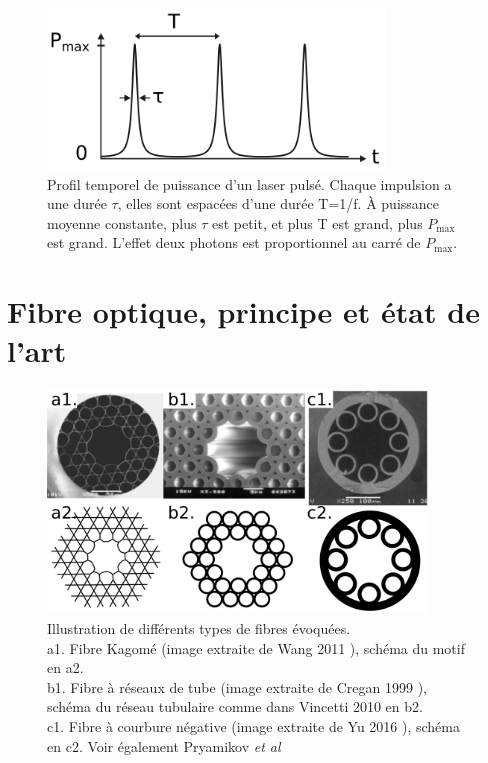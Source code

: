 
\begin{figure}
\centering
\includegraphics[width=0.8\textwidth]{./files/pulsed_laser.svg.png}
\caption{Profil temporel de puissance d'un laser pulsé. Chaque impulsion a une durée $\tau$, elles sont espacées d'une durée T=1/f. À puissance moyenne constante, plus $\tau$ est petit, et plus T est grand, plus $P_\text{max}$ est grand. L'effet deux photons est proportionnel au carré de $P_\text{max}$.
}
\label{pulsed-laser}
\end{figure}



\section{Fibre optique, principe et état de l'art}

\begin{figure}
\centering
\includegraphics[width=0.9\textwidth]{./files/fibers.svg.png}
\caption{Illustration de différents types de fibres évoquées.\\
a1. Fibre Kagomé (image extraite de Wang 2011 \cite{wang_low_2011}), schéma du motif en a2.\\
b1. Fibre à réseaux de tube (image extraite de Cregan 1999 \cite{cregan_single-mode_1999}), schéma du réseau tubulaire comme dans Vincetti 2010 \cite{vincetti_waveguiding_2010} en b2.\\
c1. Fibre à courbure négative (image extraite de Yu 2016 \cite{yu_negative_2016}), schéma en c2. Voir également Pryamikov \emph{et al} \cite{pryamikov_demonstration_2011} \\}
\end{figure}

